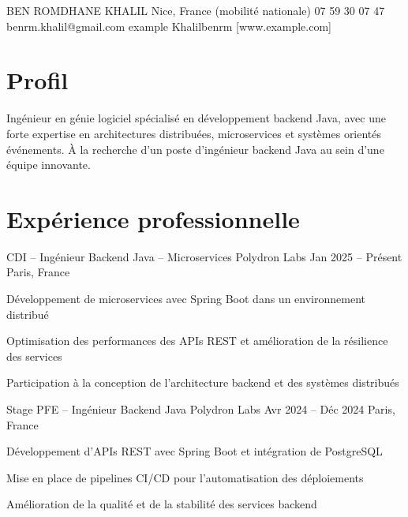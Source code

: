 \documentclass[letterpaper]{resume_config}
\begin{document}
\Header
    {BEN ROMDHANE KHALIL}%
     {Nice, France (mobilité nationale)} %
    {07 59 30 07 47} %
    {benrm.khalil@gmail.com} %
    {example} %
    {Khalilbenrm} %
    [www.example.com] %



\section{Profil}

\Profil
{Ingénieur en génie logiciel spécialisé en développement backend Java, avec une forte expertise en architectures distribuées, microservices et systèmes orientés événements. À la recherche d’un poste d’ingénieur backend Java au sein d’une équipe innovante.}

\vspace{-8pt}


\section{Expérience professionnelle}

\WorkExperience
{CDI -- Ingénieur Backend Java -- Microservices}
{Polydron Labs}
{Jan 2025 -- Présent}
{Paris, France}
{
\item Développement de microservices avec Spring Boot dans un environnement distribué
\item Optimisation des performances des APIs REST et amélioration de la résilience des services
\item Participation à la conception de l’architecture backend et des systèmes distribués
}

\WorkExperience
{Stage PFE -- Ingénieur Backend Java}
{Polydron Labs}
{Avr 2024 -- Déc 2024}
{Paris, France}
{
\item Développement d’APIs REST avec Spring Boot et intégration de PostgreSQL
\item Mise en place de pipelines CI/CD pour l’automatisation des déploiements
\item Amélioration de la qualité et de la stabilité des services backend
}
\end{document}
